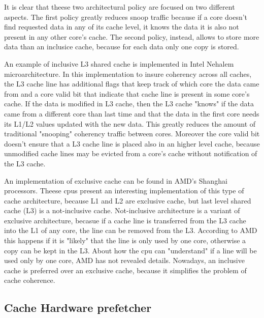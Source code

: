 It is clear that theese two architectural policy are focused on two different aspects. The first policy greatly reduces snoop traffic because if a core 
doesn't find requested data in any of its cache level, it knows the data it is also not present in any other core's cache. The second policy, instead, 
allows to store more data than an inclusice cache, because for each data only one copy is stored.

An example of inclusive L3 shared cache is implemented in Intel Nehalem microarchitecture. In this implementation to insure coherency across 
all caches, the L3 cache line has additional flags that keep track of which core the data came from and a core valid bit that indicate that cache line 
is present in some core's cache. If the data is modified in L3 cache, then the L3 cache "knows" if the data came from a different core than last time 
and that the data in the first core needs its L1/L2 values updated with the new data. This greatly reduces the amount of traditional "snooping"
coherency traffic between cores. Moreover the core valid bit doesn't ensure that a L3 cache line is placed also in an higher level cache, because unmodified
cache lines may be evicted from a core's cache without notification of the L3 cache.

An implementation of exclusive cache can be found in AMD's Shanghai processors. Theese cpus present an interesting implementation of this type of cache
architecture, because L1 and L2 are exclusive cache, but last level shared cache (L3) is a not-inclusive cache.
Not-inclusive architecture is a variant of exclusive architecture, becasue if a cache line is transferred from the L3 cache into the L1 of any core, the 
line can be removed from the L3. According to AMD this happens if it is "likely" that the line is only used by one core, otherwise a copy can be kept in 
the L3.
About how the cpu can "understand" if a line will be used only by one core, AMD has not revealed details.
Nowadays, an inclusive cache is preferred over an exclusive cache, because it simplifies the problem of cache coherence. 

\subsection{Cache Hardware prefetcher}

